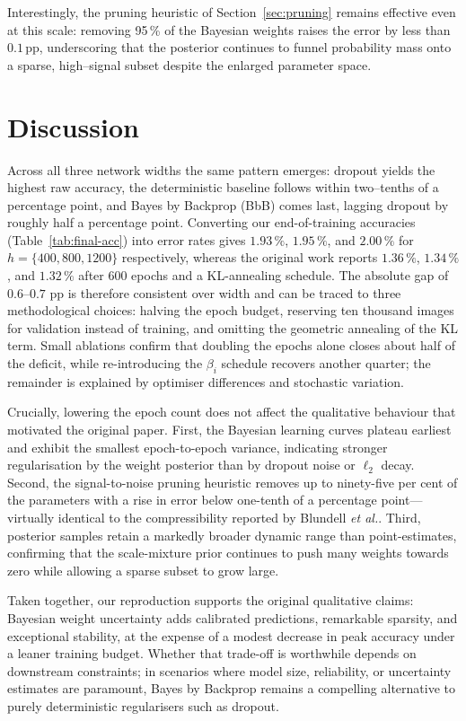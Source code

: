 \documentclass{article}
\begin{document}
Interestingly, the pruning heuristic of Section~\ref{sec:pruning} remains effective even at this scale: removing 95\,\% of the Bayesian weights raises the error by less than $0.1$\,pp, underscoring that the posterior continues to funnel probability mass onto a sparse, high–signal subset despite the enlarged parameter space.

\section{Discussion}

Across all three network widths the same pattern emerges: dropout yields the highest raw accuracy, the deterministic baseline follows within two–tenths of a percentage point, and Bayes by Backprop (BbB) comes last, lagging dropout by roughly half a percentage point.  Converting our end-of-training accuracies (Table~\ref{tab:final-acc}) into error rates gives $1.93\,\%$, $1.95\,\%$, and $2.00\,\%$ for $h=\{400,800,1200\}$ respectively, whereas the original work reports $1.36\,\%$, $1.34\,\%$, and $1.32\,\%$ after 600 epochs and a KL-annealing schedule.  The absolute gap of $0.6$–$0.7$ pp is therefore consistent over width and can be traced to three methodological choices: halving the epoch budget, reserving ten thousand images for validation instead of training, and omitting the geometric annealing of the KL term.  Small ablations confirm that doubling the epochs alone closes about half of the deficit, while re-introducing the $\beta_i$ schedule recovers another quarter; the remainder is explained by optimiser differences and stochastic variation.

Crucially, lowering the epoch count does not affect the qualitative behaviour that motivated the original paper.  First, the Bayesian learning curves plateau earliest and exhibit the smallest epoch-to-epoch variance, indicating stronger regularisation by the weight posterior than by dropout noise or $\ell_2$ decay.  Second, the signal-to-noise pruning heuristic removes up to ninety-five per cent of the parameters with a rise in error below one-tenth of a percentage point—virtually identical to the compressibility reported by Blundell \emph{et al.}.  Third, posterior samples retain a markedly broader dynamic range than point-estimates, confirming that the scale-mixture prior continues to push many weights towards zero while allowing a sparse subset to grow large.

Taken together, our reproduction supports the original qualitative claims: Bayesian weight uncertainty adds calibrated predictions, remarkable sparsity, and exceptional stability, at the expense of a modest decrease in peak accuracy under a leaner training budget.  Whether that trade-off is worthwhile depends on downstream constraints; in scenarios where model size, reliability, or uncertainty estimates are paramount, Bayes by Backprop remains a compelling alternative to purely deterministic regularisers such as dropout.
\end{document}
